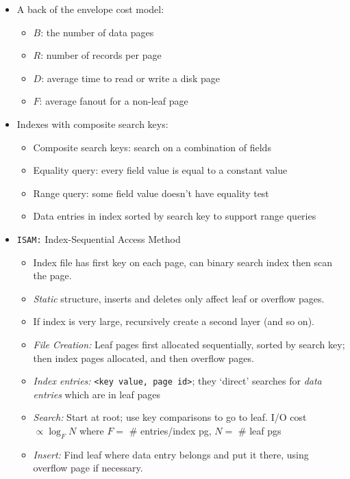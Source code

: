 \documentclass[landscape,8pt]{extarticle}
\newcommand{\code}{\lstinline}
\begin{document}
\begin{multicols}{4}
\begin{itemize}
        \item A back of the envelope cost model:
              \begin{itemize}
                  \item $B$: the number of data pages
                  \item $R$: number of records per page
                  \item $D$: average time to read or write a disk page
                  \item $F$: average fanout for a non-leaf page
              \end{itemize}
        \item Indexes with composite search keys:
              \begin{itemize}
                  \item Composite search keys: search on a combination of fields
                  \item Equality query: every field value is equal to a constant value
                  \item Range query: some field value doesn't have equality test
                  \item Data entries in index sorted by search key to support range queries
              \end{itemize}
        \item \code{ISAM:} Index-Sequential Access Method
              \begin{itemize}
                  \item Index file has first key on each page, can binary search index then scan the page.
                  \item \emph{Static} structure, inserts and deletes only affect leaf or overflow pages.
                  \item If index is very large, recursively create a second layer (and so on).
                  \item \emph{File Creation:} Leaf pages first allocated sequentially, sorted by search key; then index pages allocated, and then overflow pages.
                  \item \emph{Index entries:} \code{<key value, page id>}; they `direct' searches for \emph{data entries} which are in leaf pages
                  \item \emph{Search:} Start at root; use key comparisons to go to leaf. I/O cost $\propto \log_F N$ where $F = $ \# entries/index pg, $N = $ \# leaf pgs
                  \item \emph{Insert:} Find leaf where data entry belongs and put it there, using overflow page if necessary.

\end{itemize}
\end{itemize}
\end{multicols}
\end{document}
